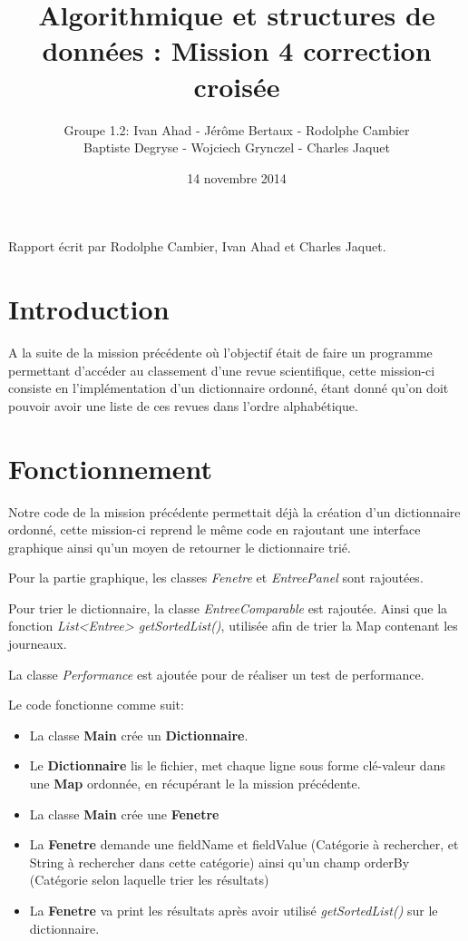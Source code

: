 \documentclass[a4paper]{article}
\title{Algorithmique et structures de données : Mission 4 correction croisée}
\date{14 novembre 2014}
\author{Groupe 1.2: Ivan Ahad - Jérôme Bertaux - Rodolphe Cambier \\ 
	Baptiste Degryse - Wojciech Grynczel - Charles Jaquet}
\begin{document}
\maketitle


Rapport écrit par Rodolphe Cambier, Ivan Ahad et Charles Jaquet.

\section*{Introduction}

A la suite de la mission précédente où l'objectif était de faire un programme permettant d'accéder au classement d'une revue scientifique, cette mission-ci consiste en l'implémentation d'un dictionnaire ordonné,  étant donné qu'on doit pouvoir avoir une liste de ces revues dans l'ordre alphabétique.


\section*{Fonctionnement}

Notre code de la mission précédente permettait déjà la création d'un dictionnaire ordonné, cette mission-ci reprend le même code en rajoutant une interface graphique ainsi qu'un moyen de retourner le dictionnaire trié.


Pour la partie graphique, les classes \textit{Fenetre} et \textit{EntreePanel} sont rajoutées.


Pour trier le dictionnaire, la classe \textit{EntreeComparable} est rajoutée. Ainsi que la fonction \textit{List<Entree> getSortedList()}, utilisée afin de trier la Map contenant les journeaux.


La classe \textit{Performance} est ajoutée pour de réaliser un test de performance.

Le code fonctionne comme suit:

\begin{itemize}
\item La classe \textbf{Main} crée un \textbf{Dictionnaire}.
\item Le \textbf{Dictionnaire} lis le fichier, met chaque ligne sous forme clé-valeur dans une \textbf{Map} ordonnée, en récupérant le la mission précédente. 
\item La classe \textbf{Main} crée une \textbf{Fenetre}
\item La \textbf{Fenetre} demande une fieldName et fieldValue (Catégorie à rechercher, et String à rechercher dans cette catégorie) ainsi qu'un champ orderBy (Catégorie selon laquelle trier les résultats)
\item La \textbf{Fenetre} va print les résultats après avoir utilisé \textit{getSortedList()} sur le dictionnaire.
\end{itemize}
\end{document}
